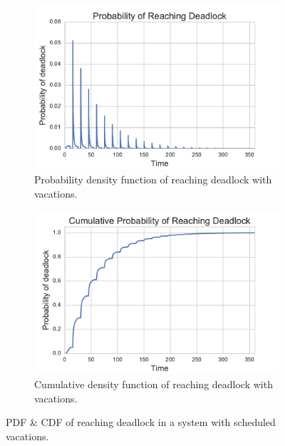 \documentclass{article}
\begin{document}
\begin{figure}
\begin{center}
\begin{subfigure}[b]{0.45\textwidth}
    \includegraphics[width=\textwidth]{img/pdf_initial.pdf}
    \caption{Probability density function of reaching deadlock with vacations.}
    \label{fig:pdfinitial}
\end{subfigure}
\begin{subfigure}[b]{0.45\textwidth}
    \includegraphics[width=\textwidth]{img/cdf_initial.pdf}
    \caption{Cumulative density function of reaching deadlock with vacations.}
    \label{fig:cdfinitial}
\end{subfigure}
\end{center}
\caption{PDF \& CDF of reaching deadlock in a system with scheduled vacations.}
\label{fig:pdfcdf_initial}
\end{figure}
\end{document}

